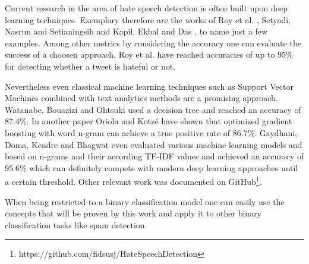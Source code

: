 Current research in the area of hate speech detection is often built upon deep learning techniques. Exemplary therefore are the works of Roy et al. \cite{Roy.2020}, Setyadi, Nasrun and Setianingsih \cite{NabiilaAdaniSetyadi.2018} and Kapil, Ekbal and Das \cite{Kapil.2020}, to name just a few examples. Among other metrics by considering the accuracy one can evaluate the success of a choosen approach. Roy et al. \cite{Roy.2020} have reached accuracies of up to 95\% for detecting whether a tweet is hateful or not.

\noindent
Nevertheless even classical machine learning techniques such as Support Vector Machines combined with text analytics methods are a promising approach.
Watanabe, Bouazizi and Ohtsuki \cite{Watanabe.2018} used a decision tree and reached an accuracy of 87.4\%. In another paper Oriola and Kotzé \cite{Oriola.2020} have shown that optimized gradient boosting with word n-gram can achieve a true positive rate of 86.7\%. Gaydhani, Doma, Kendre and Bhagwat \cite{AdityaGaydhani.2018} even evaluated various machine learning models and based on n-grams and their according TF-IDF values and achieved an accuracy of 95.6\% which can definitely compete with modern deep learning approaches until a certain threshold. Other relevant work was documented on GitHub\footnote{https://github.com/fidsusj/HateSpeechDetection}. 

When being restricted to a binary classification model one can easily use the concepts that will be proven by this work and apply it to other binary classification tasks like spam detection.
